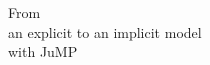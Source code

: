 \documentclass[]{beamer}
\begin{document}
\begin{frame}
\end{frame}



% 
%
\begin{frame}

\begin{center} 
\Large{From \\ an explicit to an implicit model \\ with JuMP}
\end{center}
              
\end{frame}

% 
%
\end{document}
